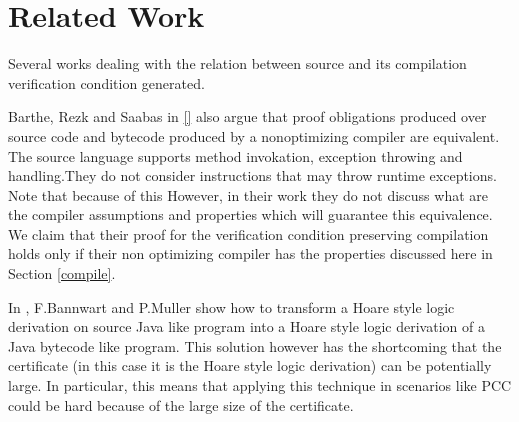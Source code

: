 \section{Related Work}\label{pog:relWork}

Several works dealing with the relation between 
source and its compilation verification condition generated.

Barthe, Rezk and Saabas in \ref{} also argue that proof obligations produced
over source code and
bytecode produced by a nonoptimizing compiler   are equivalent.
The source language supports method invokation, exception throwing and handling.They do not consider instructions that may throw
runtime exceptions. Note that because of this  However, in their work they do not discuss  what are the compiler assumptions
and properties  which will guarantee this equivalence. We claim that their proof for
 the verification condition preserving compilation holds only if their non optimizing compiler has the properties discussed here in Section
 \ref{compile}.


 In \cite{FB04LBT}, F.Bannwart and P.Muller show how to transform a Hoare style logic derivation on source Java like
 program into a Hoare style logic derivation of a Java bytecode like program. This solution however has the shortcoming
that the certificate (in this case it is the Hoare style logic derivation) can be potentially large. In particular, this means that
applying this technique in scenarios like PCC could be hard because of the large size of the certificate. 
    


